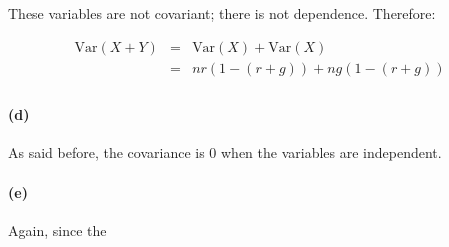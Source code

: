 \documentclass[a4paper]{article}
\begin{document}
These variables are not covariant; there is not dependence. Therefore:

\begin{equation}
\begin{array}{rll}
\mbox{Var}(X+Y) & = & \mbox{Var}(X) + \mbox{Var}(X) \\
& = & nr(1-(r+g)) + ng(1-(r+g)) \\
\end{array}
\end{equation}

\paragraph{(d)}

As said before, the covariance is 0 when the variables are independent.

\paragraph{(e)}

Again, since the 
\end{document}
